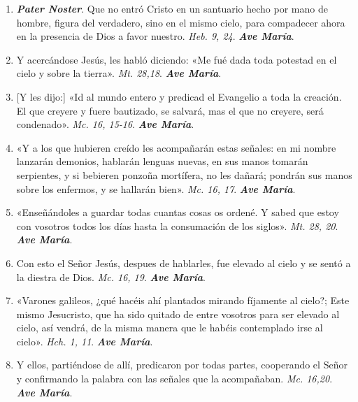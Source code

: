 \documentclass[11pt,a4paper]{book}
\begin{document}
    \begin{enumerate}
    
        \item \textbf{\emph{Pater Noster}}. Que no entró Cristo en un santuario hecho por mano de hombre, figura del verdadero, sino en el mismo cielo, para compadecer ahora en
            la presencia de Dios a favor nuestro. \emph{Heb. 9, 24}. \textbf{\emph{Ave María}}.

        \item Y acercándose Jesús, les habló diciendo: «Me fué dada toda potestad en el cielo y sobre la tierra». \emph{Mt. 28,18}. \textbf{\emph{Ave María}}.

        \item {[Y les dijo:]} «Id al mundo entero y predicad el Evangelio a toda la creación. El que creyere y fuere bautizado, 
            se salvará, mas el que no creyere, será condenado». \emph{Mc. 16, 15-16}. \textbf{\emph{Ave María}}.

        \item «Y a los que hubieren creído les acompañarán estas señales: en mi nombre lanzarán demonios, hablarán lenguas nuevas, en sus manos tomarán serpientes, 
            y si bebieren ponzoña mortífera, no les dañará; pondrán sus manos sobre los enfermos, y se hallarán bien». \emph{Mc. 16, 17}. \textbf{\emph{Ave María}}.

        \item «Enseñándoles a guardar todas cuantas cosas os ordené. Y sabed que estoy con vosotros todos los días hasta la consumación de los siglos». 
            \emph{Mt. 28, 20}. \textbf{\emph{Ave María}}.

        \item Con esto el Señor Jesús, despues de hablarles, fue elevado al cielo y se sentó a la diestra de Dios. \emph{Mc. 16, 19}. \textbf{\emph{Ave María}}.

        \item «Varones galileos, ¿qué hacéis ahí plantados mirando fíjamente al cielo?; Este mismo Jesucristo, que ha sido quitado de entre vosotros 
            para ser elevado al cielo, así vendrá, de la misma manera que le habéis contemplado irse al cielo». \emph{Hch. 1, 11}. \textbf{\emph{Ave María}}.

        \item Y ellos, partiéndose de allí, predicaron por todas partes, cooperando el Señor y confirmando la palabra con las señales que la acompañaban. 
            \emph{Mc. 16,20}. \textbf{\emph{Ave María}}.


\end{enumerate}
\end{document}
